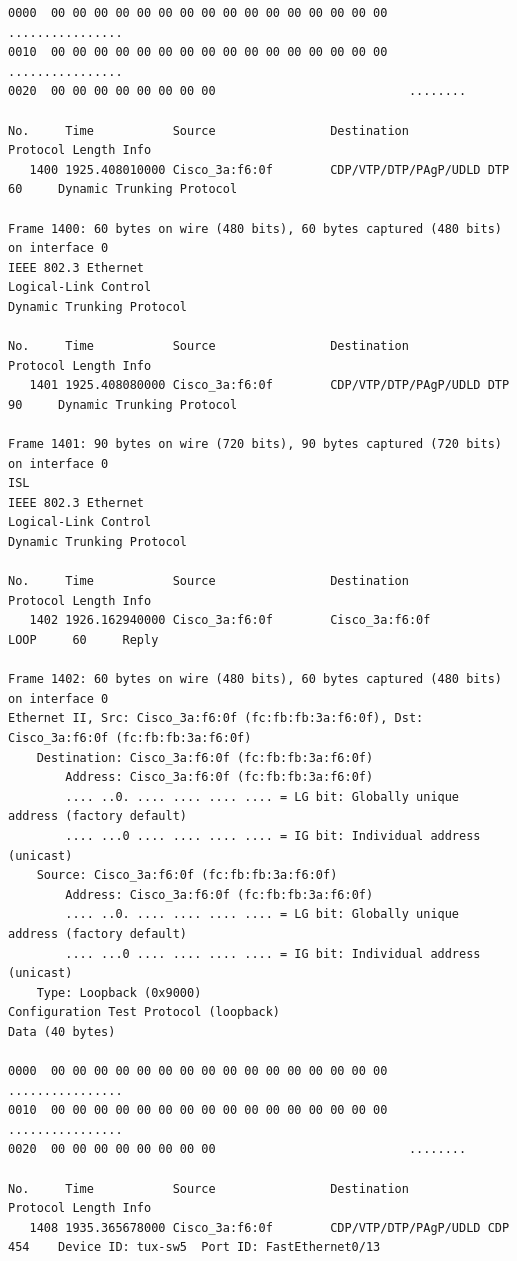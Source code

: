 \documentclass[a4paper,11pt]{article}
\begin{document}
\begin{lstlisting}
0000  00 00 00 00 00 00 00 00 00 00 00 00 00 00 00 00   ................
0010  00 00 00 00 00 00 00 00 00 00 00 00 00 00 00 00   ................
0020  00 00 00 00 00 00 00 00                           ........

No.     Time           Source                Destination           Protocol Length Info
   1400 1925.408010000 Cisco_3a:f6:0f        CDP/VTP/DTP/PAgP/UDLD DTP      60     Dynamic Trunking Protocol

Frame 1400: 60 bytes on wire (480 bits), 60 bytes captured (480 bits) on interface 0
IEEE 802.3 Ethernet 
Logical-Link Control
Dynamic Trunking Protocol

No.     Time           Source                Destination           Protocol Length Info
   1401 1925.408080000 Cisco_3a:f6:0f        CDP/VTP/DTP/PAgP/UDLD DTP      90     Dynamic Trunking Protocol

Frame 1401: 90 bytes on wire (720 bits), 90 bytes captured (720 bits) on interface 0
ISL
IEEE 802.3 Ethernet 
Logical-Link Control
Dynamic Trunking Protocol

No.     Time           Source                Destination           Protocol Length Info
   1402 1926.162940000 Cisco_3a:f6:0f        Cisco_3a:f6:0f        LOOP     60     Reply

Frame 1402: 60 bytes on wire (480 bits), 60 bytes captured (480 bits) on interface 0
Ethernet II, Src: Cisco_3a:f6:0f (fc:fb:fb:3a:f6:0f), Dst: Cisco_3a:f6:0f (fc:fb:fb:3a:f6:0f)
    Destination: Cisco_3a:f6:0f (fc:fb:fb:3a:f6:0f)
        Address: Cisco_3a:f6:0f (fc:fb:fb:3a:f6:0f)
        .... ..0. .... .... .... .... = LG bit: Globally unique address (factory default)
        .... ...0 .... .... .... .... = IG bit: Individual address (unicast)
    Source: Cisco_3a:f6:0f (fc:fb:fb:3a:f6:0f)
        Address: Cisco_3a:f6:0f (fc:fb:fb:3a:f6:0f)
        .... ..0. .... .... .... .... = LG bit: Globally unique address (factory default)
        .... ...0 .... .... .... .... = IG bit: Individual address (unicast)
    Type: Loopback (0x9000)
Configuration Test Protocol (loopback)
Data (40 bytes)

0000  00 00 00 00 00 00 00 00 00 00 00 00 00 00 00 00   ................
0010  00 00 00 00 00 00 00 00 00 00 00 00 00 00 00 00   ................
0020  00 00 00 00 00 00 00 00                           ........

No.     Time           Source                Destination           Protocol Length Info
   1408 1935.365678000 Cisco_3a:f6:0f        CDP/VTP/DTP/PAgP/UDLD CDP      454    Device ID: tux-sw5  Port ID: FastEthernet0/13  


\end{lstlisting}
\end{document}
